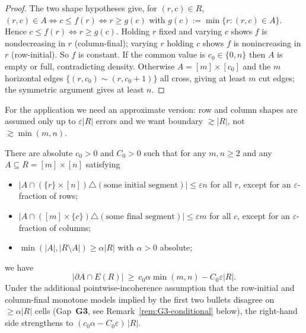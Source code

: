 \begin{proof}
The two shape hypotheses give, for $(r,c)\in R$,
$(r,c)\in A\iff c\le f(r)\iff r\ge g(c)$ with $g(c):=\min\{r:(r,c)\in A\}$.
Hence $c\le f(r)\iff r\ge g(c)$. Holding $r$ fixed and varying $c$ shows
$f$ is nondecreasing in $r$ (column-final); varying $r$ holding $c$ shows
$f$ is nonincreasing in $r$ (row-initial). So $f$ is constant. If the
common value is $c_0\in\{0,n\}$ then $A$ is empty or full, contradicting
density. Otherwise $A=[m]\times[c_0]$ and the $m$ horizontal edges
$\{(r,c_0)\sim(r,c_0+1)\}$ all cross, giving at least $m$ cut edges; the
symmetric argument gives at least $n$.
\end{proof}

For the application we need an approximate version: row and column
shapes are assumed only up to $\varepsilon|R|$ errors and we want
boundary $\gtrsim|R|$, not $\gtrsim\min(m,n)$.

\begin{lemma}
\label{lem:rect-stable}
There are absolute $c_0>0$ and $C_0>0$ such that for any $m,n\ge2$ and
any $A\subseteq R=[m]\times[n]$ satisfying
\begin{itemize}
\item $|A\cap(\{r\}\times[n])\triangle(\text{some initial segment})|
\le\varepsilon n$ for all $r$, except for an $\varepsilon$-fraction of rows;
\item $|A\cap([m]\times\{c\})\triangle(\text{some final segment})|
\le\varepsilon m$ for all $c$, except for an $\varepsilon$-fraction of columns;
\item $\min(|A|,|R\setminus A|)\ge\alpha|R|$ with $\alpha>0$ absolute;
\end{itemize}
we have
\[
|\partial A\cap E(R)|\ \ge\ c_0\alpha\min(m,n)-C_0\varepsilon|R|.
\]
Under the additional pointwise-incoherence assumption that the
row-initial and column-final monotone models implied by the first two
bullets disagree on $\ge\alpha|R|$ cells (Gap~\textbf{G3}, see
Remark~\ref{rem:G3-conditional} below), the right-hand side strengthens
to $(c_0\alpha-C_0\varepsilon)\,|R|$.
\end{lemma}

